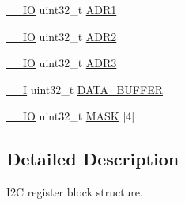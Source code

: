 \begin{DoxyCompactItemize}
\hyperlink{core__cm3_8h_aec43007d9998a0a0e01faede4133d6be}{\-\_\-\-\_\-\-I\-O} uint32\-\_\-t \hyperlink{structLPC__I2C__T_ad948a871ac4d57bde1698f91ea554903}{A\-D\-R1}
\item 
\hyperlink{core__cm3_8h_aec43007d9998a0a0e01faede4133d6be}{\-\_\-\-\_\-\-I\-O} uint32\-\_\-t \hyperlink{structLPC__I2C__T_aad3c43c326c675b3c9a02936f7b906fa}{A\-D\-R2}
\item 
\hyperlink{core__cm3_8h_aec43007d9998a0a0e01faede4133d6be}{\-\_\-\-\_\-\-I\-O} uint32\-\_\-t \hyperlink{structLPC__I2C__T_a554732a259fca555bcec4201d756e945}{A\-D\-R3}
\item 
\hyperlink{core__cm3_8h_af63697ed9952cc71e1225efe205f6cd3}{\-\_\-\-\_\-\-I} uint32\-\_\-t \hyperlink{structLPC__I2C__T_a63283a528320f69703f42fcc919ab4bc}{D\-A\-T\-A\-\_\-\-B\-U\-F\-F\-E\-R}
\item 
\hyperlink{core__cm3_8h_aec43007d9998a0a0e01faede4133d6be}{\-\_\-\-\_\-\-I\-O} uint32\-\_\-t \hyperlink{structLPC__I2C__T_a9e734d7a24b7a02ac1887608552b9c69}{M\-A\-S\-K} \mbox{[}4\mbox{]}
\end{DoxyCompactItemize}


\subsection{Detailed Description}
I2\-C register block structure. 

